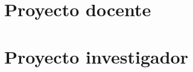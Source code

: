 \documentclass[12pt,a4paper]{book}
\begin{document}



%    
%    


\setcounter{tocdepth}{2}
\tableofcontents


\clearpage

\chapter{Proyecto docente}



\chapter{Proyecto investigador}






%
\end{document}
